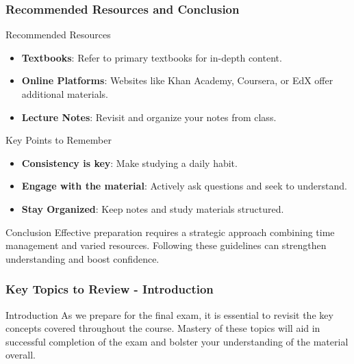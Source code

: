 \documentclass[aspectratio=169]{beamer}
\begin{document}
\begin{frame}[fragile]
    \frametitle{Recommended Resources and Conclusion}
    \begin{block}{Recommended Resources}
        \begin{itemize}
            \item \textbf{Textbooks}: Refer to primary textbooks for in-depth content.
            \item \textbf{Online Platforms}: Websites like Khan Academy, Coursera, or EdX offer additional materials.
            \item \textbf{Lecture Notes}: Revisit and organize your notes from class.
        \end{itemize}
    \end{block}

    \begin{block}{Key Points to Remember}
        \begin{itemize}
            \item \textbf{Consistency is key}: Make studying a daily habit.
            \item \textbf{Engage with the material}: Actively ask questions and seek to understand.
            \item \textbf{Stay Organized}: Keep notes and study materials structured.
        \end{itemize}
    \end{block}

    \begin{block}{Conclusion}
        Effective preparation requires a strategic approach combining time management and varied resources. Following these guidelines can strengthen understanding and boost confidence.
    \end{block}
\end{frame}

\begin{frame}[fragile]
    \frametitle{Key Topics to Review - Introduction}
    \begin{block}{Introduction}
        As we prepare for the final exam, it is essential to revisit the key concepts covered throughout the course. 
        Mastery of these topics will aid in successful completion of the exam and bolster your understanding of the material overall.
    \end{block}
\end{frame}
\end{document}
